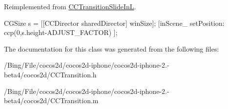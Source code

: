 Reimplemented from \hyperlink{interface_c_c_transition_slide_in_l_a1040ca9a5abc535c40d8a1a5fd23f03c}{C\-C\-Transition\-Slide\-In\-L}.


\begin{DoxyCode}
{
        CGSize s = [[CCDirector sharedDirector] winSize];
        [inScene_ setPosition: ccp(0,s.height-ADJUST_FACTOR) ];
}
\end{DoxyCode}


The documentation for this class was generated from the following files\-:\begin{DoxyCompactItemize}
\item 
/\-Bing/\-File/cocos2d/cocos2d-\/iphone/cocos2d-\/iphone-\/2.-\/beta4/cocos2d/C\-C\-Transition.\-h\item 
/\-Bing/\-File/cocos2d/cocos2d-\/iphone/cocos2d-\/iphone-\/2.-\/beta4/cocos2d/C\-C\-Transition.\-m\end{DoxyCompactItemize}
